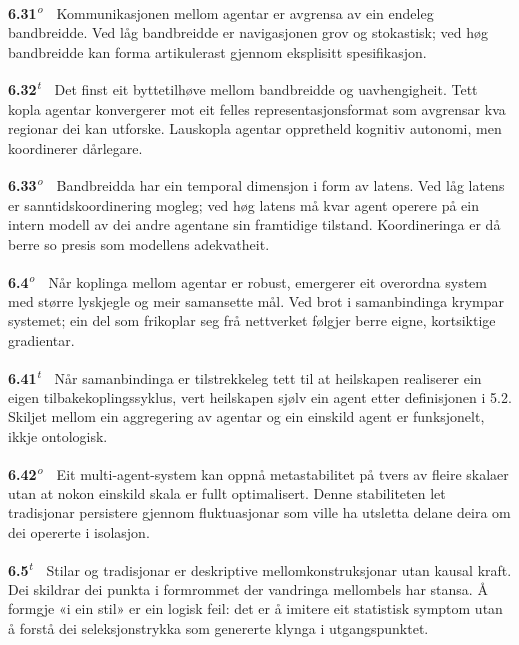 \documentclass[10pt]{article}
\begin{document}
\noindent\textbf{6.31}\textsuperscript{\textit{o}}~~Kommunikasjonen mellom agentar er avgrensa av ein endeleg bandbreidde. Ved låg bandbreidde er navigasjonen grov og stokastisk; ved høg bandbreidde kan forma artikulerast gjennom eksplisitt spesifikasjon.




\noindent\textbf{6.32}\textsuperscript{\textit{t}}~~Det finst eit byttetilhøve mellom bandbreidde og uavhengigheit. Tett kopla agentar konvergerer mot eit felles representasjonsformat som avgrensar kva regionar dei kan utforske. Lauskopla agentar oppretheld kognitiv autonomi, men koordinerer dårlegare.




\noindent\textbf{6.33}\textsuperscript{\textit{o}}~~Bandbreidda har ein temporal dimensjon i form av latens. Ved låg latens er sanntidskoordinering mogleg; ved høg latens må kvar agent operere på ein intern modell av dei andre agentane sin framtidige tilstand. Koordineringa er då berre so presis som modellens adekvatheit.




\noindent\textbf{6.4}\textsuperscript{\textit{o}}~~Når koplinga mellom agentar er robust, emergerer eit overordna system med større lyskjegle og meir samansette mål. Ved brot i samanbindinga krympar systemet; ein del som frikoplar seg frå nettverket følgjer berre eigne, kortsiktige gradientar.




\noindent\textbf{6.41}\textsuperscript{\textit{t}}~~Når samanbindinga er tilstrekkeleg tett til at heilskapen realiserer ein eigen tilbakekoplingssyklus, vert heilskapen sjølv ein agent etter definisjonen i 5.2. Skiljet mellom ein aggregering av agentar og ein einskild agent er funksjonelt, ikkje ontologisk.




\noindent\textbf{6.42}\textsuperscript{\textit{o}}~~Eit multi-agent-system kan oppnå metastabilitet på tvers av fleire skalaer utan at nokon einskild skala er fullt optimalisert. Denne stabiliteten let tradisjonar persistere gjennom fluktuasjonar som ville ha utsletta delane deira om dei opererte i isolasjon.




\noindent\textbf{6.5}\textsuperscript{\textit{t}}~~Stilar og tradisjonar er deskriptive mellomkonstruksjonar utan kausal kraft. Dei skildrar dei punkta i formrommet der vandringa mellombels har stansa. Å formgje «i ein stil» er ein logisk feil: det er å imitere eit statistisk symptom utan å forstå dei seleksjonstrykka som genererte klynga i utgangspunktet.
\end{document}
